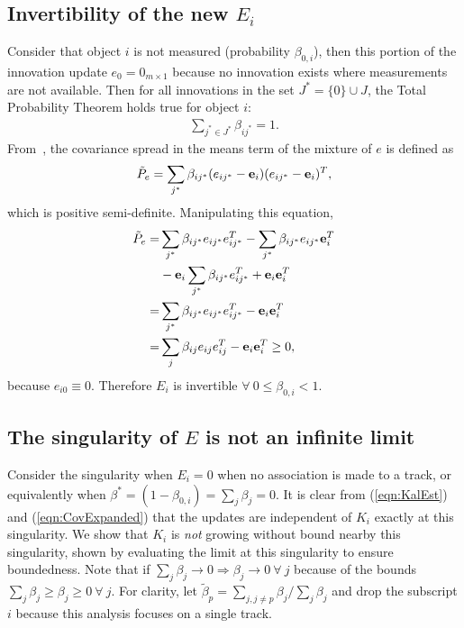 \documentclass[letterpaper, 10pt, conference]{ieeeconf}
\newcommand{\refeqn}[1]{(\ref{eqn:#1})}
\begin{document}
\begin{appendix}
\label{append}

\subsection{Invertibility of the new $E_i$} \label{NewPartOfEIsPSD}
Consider that object $i$ is not measured (probability $\beta_{0,i}$), then this portion of the innovation update $e_0=0_{m\times1}$ because no innovation exists where measurements are not available.
Then for all innovations in the set $J^*=\{0\}\cup J$, the Total Probability Theorem holds true for object $i$:
\begin{align}
\sum\limits_{j^*\in J^*}\beta_{ij^*}=1.
\end{align}
From~\cite[Eq. 1.4.16-(1-10)]{ShaRonThi2001}, the covariance spread in the means term of the mixture of $e$ is defined as%
\begin{align}
\tilde P_e=\sum\limits_{j^*}\beta_{ij^*}(e_{ij^*}-{\bf e}_{i})(e_{ij^*}-{\bf e}_{i})^T,
\end{align}
which is positive semi-definite. Manipulating this equation,
\begin{align}
\tilde P_e=&\sum\limits_{j^*}\beta_{ij^*}e_{ij^*}e_{ij^*}^T
-\sum\limits_{j^*}\beta_{ij^*}e_{ij^*}{\bf e}_{i}^T\nonumber
\\
&
-{\bf e}_{i}\sum\limits_{j^*}\beta_{ij^*}e_{ij^*}^T
+{\bf e}_{i}{\bf e}_{i}^T\nonumber
\\
=&\sum\limits_{j^*}\beta_{ij^*}e_{ij^*}e_{ij^*}^T-{\bf e}_{i}{\bf e}_{i}^T\nonumber
\\
=&\sum\limits_{j}\beta_{ij}e_{ij}e_{ij}^T-{\bf e}_{i}{\bf e}_{i}^T\geq0,
\label{eqn:CovSpreadPSD}
\end{align}
because $e_{i0}\equiv0$. Therefore $E_i$ is invertible $\forall\ 0\leq\beta_{0,i}<1$.


\subsection{The singularity of $E$ is not an infinite limit}
Consider the singularity when $E_i=0$ when no association is made to a track, or equivalently when $\beta^*=(1-\beta_{0,i})=\sum\limits_{j}\beta_j=0$.
It is clear from \refeqn{KalEst} and \refeqn{CovExpanded} that the updates are independent of $K_i$ exactly at this singularity.
We show that $K_i$ is \emph{not} growing without bound nearby this singularity, shown by evaluating the limit at this singularity to ensure boundedness.
Note that if $\sum\limits_{j}\beta_j\rightarrow0\Rightarrow \beta_j\rightarrow0\ \forall\ j$ because of the bounds $\sum\limits_{j}\beta_j\geq\beta_j\geq0\ \forall \ j$.
For clarity, let $\tilde\beta_p=\sum\limits_{j,j\neq p}\beta_j/\sum\limits_{j}\beta_j$ and drop the subscript $i$ because this analysis focuses on a single track.


\end{appendix}
\end{document}
